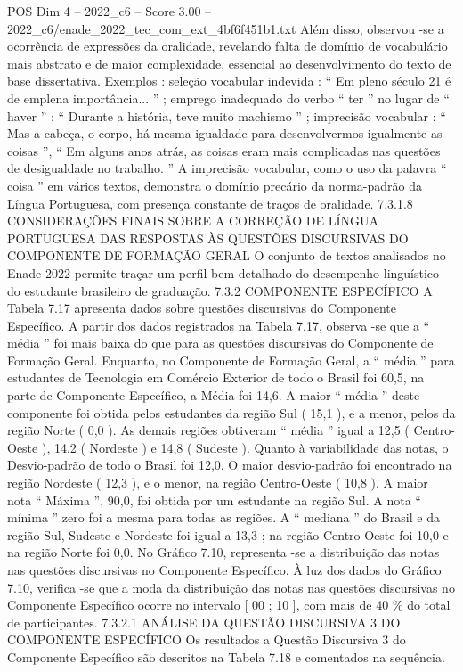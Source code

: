 \begin{textsample}{POS Dim 4 – 2022\_c6 – Score 3.00 – 2022\_c6/enade\_2022\_tec\_com\_ext\_4bf6f451b1.txt}
Além disso, observou -se a ocorrência de expressões da oralidade, revelando falta de domínio de vocabulário mais abstrato e de maior complexidade, essencial ao desenvolvimento do texto de base dissertativa.
Exemplos : seleção vocabular indevida : “ Em pleno século 21 é de emplena importância... ” ; emprego inadequado do verbo “ ter ” no lugar de “ haver ” : “ Durante a história, teve muito machismo ” ; imprecisão vocabular : “ Mas a cabeça, o corpo, há mesma igualdade para desenvolvermos igualmente as coisas ”, “ Em alguns anos atrás, as coisas eram mais complicadas nas questões de desigualdade no trabalho. ” A imprecisão vocabular, como o uso da palavra “ coisa ” em vários textos, demonstra o domínio precário da norma-padrão da Língua Portuguesa, com presença constante de traços de oralidade. 7.3.1.8 CONSIDERAÇÕES FINAIS SOBRE A CORREÇÃO DE LÍNGUA PORTUGUESA DAS RESPOSTAS ÀS QUESTÕES DISCURSIVAS DO COMPONENTE DE FORMAÇÃO GERAL O conjunto de textos analisados no Enade 2022 permite traçar um perfil bem detalhado do desempenho linguístico do estudante brasileiro de graduação. 7.3.2 COMPONENTE ESPECÍFICO A Tabela 7.17 apresenta dados sobre questões discursivas do Componente Específico.
A partir dos dados registrados na Tabela 7.17, observa -se que a “ média ” foi mais baixa do que para as questões discursivas do Componente de Formação Geral.
Enquanto, no Componente de Formação Geral, a “ média ” para estudantes de Tecnologia em Comércio Exterior de todo o Brasil foi 60,5, na parte de Componente Específico, a Média foi 14,6.
A maior “ média ” deste componente foi obtida pelos estudantes da região Sul ( 15,1 ), e a menor, pelos da região Norte ( 0,0 ).
As demais regiões obtiveram “ média ” igual a 12,5 ( Centro-Oeste ), 14,2 ( Nordeste ) e 14,8 ( Sudeste ).
Quanto à variabilidade das notas, o Desvio-padrão de todo o Brasil foi 12,0.
O maior desvio-padrão foi encontrado na região Nordeste ( 12,3 ), e o menor, na região Centro-Oeste ( 10,8 ).
A maior nota “ Máxima ”, 90,0, foi obtida por um estudante na região Sul.
A nota “ mínima ” zero foi a mesma para todas as regiões.
A “ mediana ” do Brasil e da região Sul, Sudeste e Nordeste foi igual a 13,3 ; na região Centro-Oeste foi 10,0 e na região Norte foi 0,0.
No Gráfico 7.10, representa -se a distribuição das notas nas questões discursivas no Componente Específico.
À luz dos dados do Gráfico 7.10, verifica -se que a moda da distribuição das notas nas questões discursivas no Componente Específico ocorre no intervalo [ 00 ; 10 ], com mais de 40 \% do total de participantes. 7.3.2.1 ANÁLISE DA QUESTÃO DISCURSIVA 3 DO COMPONENTE ESPECÍFICO Os resultados a Questão Discursiva 3 do Componente Específico são descritos na Tabela 7.18 e comentados na sequência.

\end{textsample}
